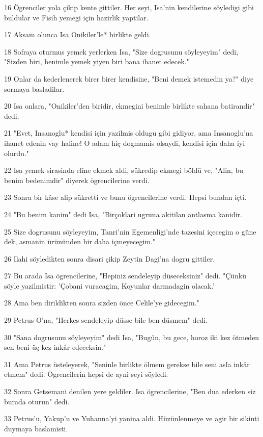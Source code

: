\par 16 Ögrenciler yola çikip kente gittiler. Her seyi, Isa'nin kendilerine söyledigi gibi buldular ve Fisih yemegi için hazirlik yaptilar.
\par 17 Aksam olunca Isa Onikiler'le* birlikte geldi.
\par 18 Sofraya oturmus yemek yerlerken Isa, "Size dogrusunu söyleyeyim" dedi, "Sizden biri, benimle yemek yiyen biri bana ihanet edecek."
\par 19 Onlar da kederlenerek birer birer kendisine, "Beni demek istemedin ya?" diye sormaya basladilar.
\par 20 Isa onlara, "Onikiler'den biridir, ekmegini benimle birlikte sahana batirandir" dedi.
\par 21 "Evet, Insanoglu* kendisi için yazilmis oldugu gibi gidiyor, ama Insanoglu'na ihanet edenin vay haline! O adam hiç dogmamis olsaydi, kendisi için daha iyi olurdu."
\par 22 Isa yemek sirasinda eline ekmek aldi, sükredip ekmegi böldü ve, "Alin, bu benim bedenimdir" diyerek ögrencilerine verdi.
\par 23 Sonra bir kâse alip sükretti ve bunu ögrencilerine verdi. Hepsi bundan içti.
\par 24 "Bu benim kanim" dedi Isa, "Birçoklari ugruna akitilan antlasma kanidir.
\par 25 Size dogrusunu söyleyeyim, Tanri'nin Egemenligi'nde tazesini içecegim o güne dek, asmanin ürününden bir daha içmeyecegim."
\par 26 Ilahi söyledikten sonra disari çikip Zeytin Dagi'na dogru gittiler.
\par 27 Bu arada Isa ögrencilerine, "Hepiniz sendeleyip düseceksiniz" dedi. "Çünkü söyle yazilmistir: 'Çobani vuracagim, Koyunlar darmadagin olacak.'
\par 28 Ama ben dirildikten sonra sizden önce Celile'ye gidecegim."
\par 29 Petrus O'na, "Herkes sendeleyip düsse bile ben düsmem" dedi.
\par 30 "Sana dogrusunu söyleyeyim" dedi Isa, "Bugün, bu gece, horoz iki kez ötmeden sen beni üç kez inkâr edeceksin."
\par 31 Ama Petrus üsteleyerek, "Seninle birlikte ölmem gerekse bile seni asla inkâr etmem" dedi. Ögrencilerin hepsi de ayni seyi söyledi.
\par 32 Sonra Getsemani denilen yere geldiler. Isa ögrencilerine, "Ben dua ederken siz burada oturun" dedi.
\par 33 Petrus'u, Yakup'u ve Yuhanna'yi yanina aldi. Hüzünlenmeye ve agir bir sikinti duymaya baslamisti.
